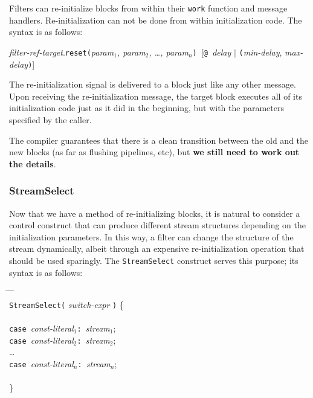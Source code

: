 Filters can re-initialize blocks from within their {\tt work} function
and message handlers.  Re-initialization can not be done from within
initialization code.  The syntax is as follows:

\medskip
{\it filter-ref-target}.{\tt reset(}{\it param$_1$, param$_2$, \dots, param$_n$}{\tt) }[{\tt @ }{\it delay} $|$ {\tt (}{\it min-delay}, {\it max-delay}{\tt )}]
\medskip

The re-initialization signal is delivered to a block just like any
other message.  Upon receiving the re-initialization message, the
target block executes all of its initialization code just as it did in
the beginning, but with the parameters specified by the caller.  

The compiler guarantees that there is a clean transition between the
old and the new blocks (as far as flushing pipelines, etc), but {\bf
we still need to work out the details}.

\subsubsection{StreamSelect}
\label{sec:streamselect}

Now that we have a method of re-initializing blocks, it is natural to
consider a control construct that can produce different stream
structures depending on the initialization parameters.  In this way, a
filter can change the structure of the stream dynamically, albeit
through an expensive re-initialization operation that should be used
sparingly.  The {\tt StreamSelect} construct serves this purpose; its
syntax is as follows:

\begin{tabbing}
\hspace{0.2in} \= \hspace{0.2in} \= \hspace{0.2in} \= \hspace{0.2in} \= \\

{\tt StreamSelect(} {\it switch-expr} {\tt )} \{ \\ \\
\> {\tt case }{\it const-literal$_1$}{\tt :  }{\it stream$_1$}; \\
\> {\tt case }{\it const-literal$_2$}{\tt :  }{\it stream$_2$}; \\
\> \dots \\
\> {\tt case }{\it const-literal$_n$}{\tt :  }{\it stream$_{n}$}; \\
 \\
\}
\end{tabbing}

